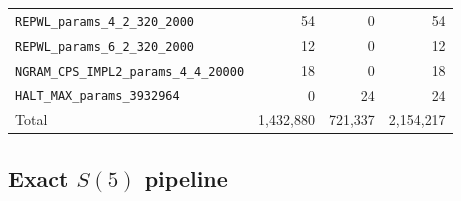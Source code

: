 \documentclass[a4paper,british]{article}
\theoremstyle{definition} %
\numberwithin{equation}{section}
\theoremstyle{definition} %
\begin{document}
\begin{table}[h!]
\begin{tabular}{|lrrr|}
        \texttt{REPWL\_params\_4\_2\_320\_2000}           & 54            & 0         & 54            \\
        \texttt{REPWL\_params\_6\_2\_320\_2000}           & 12            & 0         & 12            \\
        \texttt{NGRAM\_CPS\_IMPL2\_params\_4\_4\_20000}   & 18            & 0         & 18            \\
        \texttt{HALT\_MAX\_params\_3932964}               & 0             & 24        & 24            \\
        \hline
        Total                                             & 1{,}432{,}880 & 721{,}337 & 2{,}154{,}217 \\
        \hline
    \end{tabular}
\end{table}

\subsection{Exact $S(5)$ pipeline}\label{app:pipeS5exact}
\end{document}
